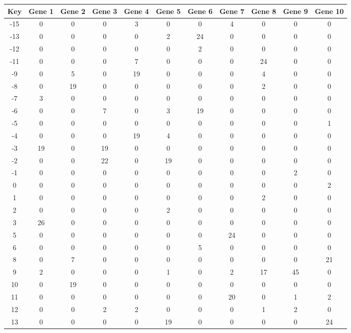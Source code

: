 \begin{tabular}{|c|c|c|c|c|c|c|c|c|c|c|}
\hline
Key & Gene 1 & Gene 2 & Gene 3 & Gene 4 & Gene 5 & Gene 6 & Gene 7 & Gene 8 & Gene 9 & Gene 10 \\
\hline
-15 & 0 & 0 & 0 & 3 & 0 & 0 & 4 & 0 & 0 & 0 \\
-13 & 0 & 0 & 0 & 0 & 2 & 24 & 0 & 0 & 0 & 0 \\
-12 & 0 & 0 & 0 & 0 & 0 & 2 & 0 & 0 & 0 & 0 \\
-11 & 0 & 0 & 0 & 7 & 0 & 0 & 0 & 24 & 0 & 0 \\
-9 & 0 & 5 & 0 & 19 & 0 & 0 & 0 & 4 & 0 & 0 \\
-8 & 0 & 19 & 0 & 0 & 0 & 0 & 0 & 2 & 0 & 0 \\
-7 & 3 & 0 & 0 & 0 & 0 & 0 & 0 & 0 & 0 & 0 \\
-6 & 0 & 0 & 7 & 0 & 3 & 19 & 0 & 0 & 0 & 0 \\
-5 & 0 & 0 & 0 & 0 & 0 & 0 & 0 & 0 & 0 & 1 \\
-4 & 0 & 0 & 0 & 19 & 4 & 0 & 0 & 0 & 0 & 0 \\
-3 & 19 & 0 & 19 & 0 & 0 & 0 & 0 & 0 & 0 & 0 \\
-2 & 0 & 0 & 22 & 0 & 19 & 0 & 0 & 0 & 0 & 0 \\
-1 & 0 & 0 & 0 & 0 & 0 & 0 & 0 & 0 & 2 & 0 \\
0 & 0 & 0 & 0 & 0 & 0 & 0 & 0 & 0 & 0 & 2 \\
1 & 0 & 0 & 0 & 0 & 0 & 0 & 0 & 2 & 0 & 0 \\
2 & 0 & 0 & 0 & 0 & 2 & 0 & 0 & 0 & 0 & 0 \\
3 & 26 & 0 & 0 & 0 & 0 & 0 & 0 & 0 & 0 & 0 \\
5 & 0 & 0 & 0 & 0 & 0 & 0 & 24 & 0 & 0 & 0 \\
6 & 0 & 0 & 0 & 0 & 0 & 5 & 0 & 0 & 0 & 0 \\
8 & 0 & 7 & 0 & 0 & 0 & 0 & 0 & 0 & 0 & 21 \\
9 & 2 & 0 & 0 & 0 & 1 & 0 & 2 & 17 & 45 & 0 \\
10 & 0 & 19 & 0 & 0 & 0 & 0 & 0 & 0 & 0 & 0 \\
11 & 0 & 0 & 0 & 0 & 0 & 0 & 20 & 0 & 1 & 2 \\
12 & 0 & 0 & 2 & 2 & 0 & 0 & 0 & 1 & 2 & 0 \\
13 & 0 & 0 & 0 & 0 & 19 & 0 & 0 & 0 & 0 & 24 \\
\hline
\end{tabular}